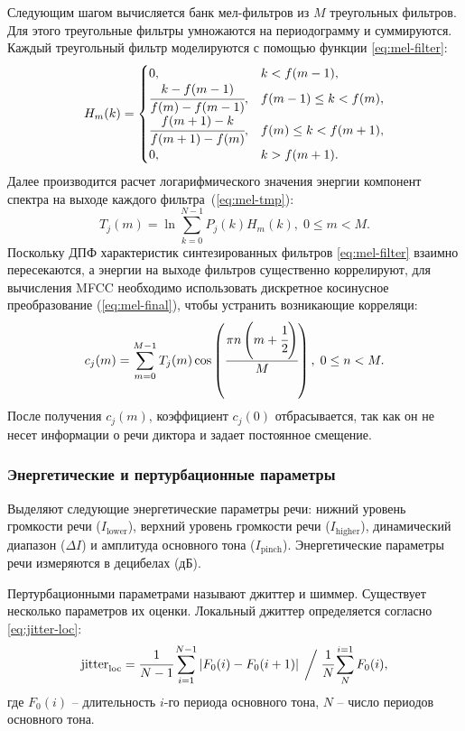 Следующим шагом вычисляется банк мел-фильтров из $M$ треугольных фильтров. Для этого треугольные фильтры умножаются на периодограмму и суммируются. Каждый треугольный фильтр моделируются с помощью функции \ref{eq:mel-filter}:
\begin{equation}\label{eq:mel-filter}
	H_m(k) = \begin{cases}
		0, & k < f(m - 1), \\
		\cfrac{k - f(m - 1)}{f(m) - f(m - 1)}, & f(m - 1) \leq k < f(m),\\
		\cfrac{f(m + 1) - k}{f(m + 1) - f(m)}, & f(m) \leq k < f(m + 1),\\
		0, & k > f(m + 1).\\
	\end{cases}
\end{equation}
Далее производится расчет логарифмического значения энергии компонент спектра на выходе каждого фильтра~(\ref{eq:mel-tmp}):
\begin{equation}\label{eq:mel-tmp}
	T_j(m) = \ln \sum_{k = 0}^{N - 1}P_j(k)H_m(k),\;0 \leq m < M.
\end{equation}
Поскольку ДПФ характеристик синтезированных фильтров \ref{eq:mel-filter} взаимно пересекаются, а энергии на выходе фильтров существенно коррелируют, для вычисления MFCC необходимо использовать дискретное косинусное преобразование (\ref{eq:mel-final}), чтобы устранить возникающие корреляци:
\begin{equation}\label{eq:mel-final}
	c_j(m) = \sum_{m=0}^{M-1}T_j(m)\cos\left(\cfrac{\pi n\left(m + \cfrac{1}{2}\right)}{M}\right),\;0 \leq n < M.
\end{equation}
После получения $c_j(m)$, коэффициент $c_j(0)$ отбрасывается, так как он не несет информации о речи диктора
и задает постоянное смещение.~\cite{frames}

\subsubsection{Энергетические и пертурбационные параметры}

Выделяют следующие энергетические параметры речи: нижний уровень громкости речи ($I_{\mathrm{lower}}$), верхний уровень громкости речи ($I_{\mathrm{higher}}$), динамический диапазон ($\Delta I$) и амплитуда основного тона ($I_{\mathrm{pinch}}$). Энергетические параметры речи измеряются в децибелах (дБ).

Пертурбационными параметрами называют джиттер и шиммер. Существует несколько параметров их оценки. Локальный джиттер определяется согласно \ref{eq:jitter-loc}:
\begin{equation}\label{eq:jitter-loc}
	\mathrm{jitter}_{\mathrm{loc}} = \cfrac{1}{N - 1}\sum_{i = 1}^{N - 1}\left|F_0(i) - F_0(i + 1)\right|\;\bigg/\;
		\cfrac{1}{N}\sum_{N}^{i = 1}F_0(i),
\end{equation}
где $F_0(i)$ -- длительность $i$-го периода основного тона, $N$ -- число периодов основного тона.

